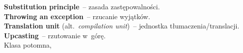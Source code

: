 \documentclass[a4paper,11pt]{article}
\begin{document}
\textbf{Substitution principle}~-- zasada zastępowalności. \\
\textbf{Throwing an exception}~-- rzucanie wyjątków. \\
\textbf{Translation unit} (alt.~\textit{compilation unit})~-- jednostka
tłumaczenia/translacji. \\
\textbf{Upcasting}~-- rzutowanie w~górę. \\
Klasa potomna, \\














\printbibliography





\end{document}

